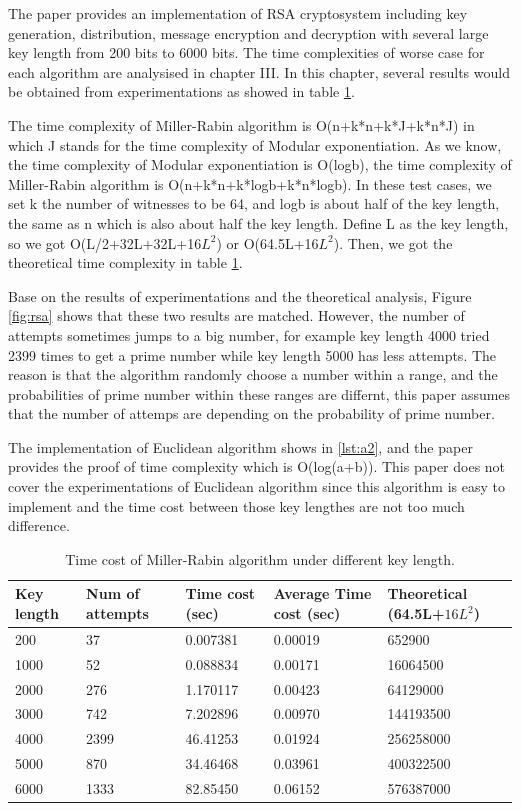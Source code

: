 \documentclass[12pt, oneside]{book}
\begin{document}
The paper provides an implementation of RSA cryptosystem including key generation, distribution, message encryption and decryption with several large key length from 200 bits to 6000 bits. The time complexities of worse case for each algorithm are analysised in chapter III. In this chapter, several results would be obtained from experimentations as showed in table \ref{tab:mr}.\par
The time complexity of Miller-Rabin algorithm is O(n+k*n+k*J+k*n*J) in which J stands for the time complexity of Modular exponentiation. As we know, the time complexity of Modular exponentiation is O(logb), the time complexity of Miller-Rabin algorithm is O(n+k*n+k*logb+k*n*logb). In these test cases, we set k the number of witnesses to be 64, and logb is about half of the key length, the same as n which is also about half the key length. Define L as the key length, so we got O(L/2+32L+32L+16$L^2$) or O(64.5L+16$L^2$). Then, we got the theoretical time complexity in table \ref{tab:mr}.\par
Base on the results of experimentations and the theoretical analysis, Figure \ref{fig:rsa} shows that these two results are matched. However, the number of attempts sometimes jumps to a big number, for example key length 4000 tried 2399 times to get a prime number while key length 5000 has less attempts. The reason is that the algorithm randomly choose a number within a range, and the probabilities of prime number within these ranges are differnt, this paper assumes that the number of attemps are depending on the probability of prime number.\par
The implementation of Euclidean algorithm shows in \ref{lst:a2}, and the paper provides the proof of time complexity which is O(log(a+b)). This paper does not cover the experimentations of Euclidean algorithm since this algorithm is easy to implement and the time cost between those key lengthes are not too much difference.\par
\begin{table}
{\hspace{0cm}
\begin{tabular}{|p{2cm}|p{2.5cm}|p{2.5cm}|p{3cm}|p{3cm}|}
\hline
\textbf{Key length} & \textbf{Num of attempts} & \textbf{Time cost (sec)} & \textbf{Average Time cost (sec)} & \textbf{Theoretical (64.5L+$16L^2$)}\\
\hline 
200 & 37 & 0.007381 & 0.00019 & 652900\\
\hline
1000 & 52 & 0.088834 & 0.00171 & 16064500\\
\hline
2000 & 276 & 1.170117 & 0.00423 & 64129000\\
\hline
3000 & 742 & 7.202896 & 0.00970 & 144193500\\
\hline
4000 & 2399 & 46.41253 & 0.01924 & 256258000\\
\hline
5000 & 870 & 34.46468 & 0.03961 & 400322500\\
\hline
6000 & 1333 & 82.85450 & 0.06152 & 576387000\\
\hline
\end{tabular}
}
\caption{Time cost of Miller-Rabin algorithm under different key length.}
\label{tab:mr}
\end{table}
\end{document}
